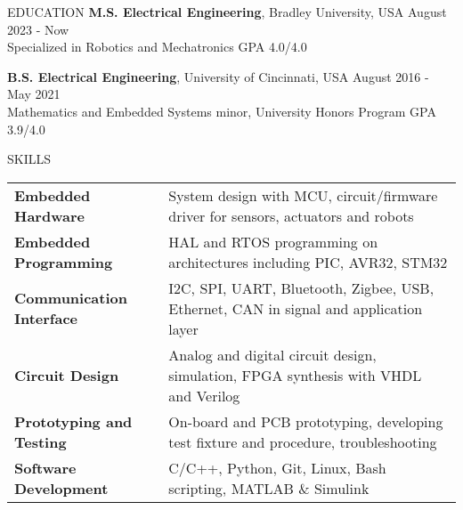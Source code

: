 \documentclass{lib/resume} %
\begin{document}

\begin{rSection}{EDUCATION}
    {\bf M.S. Electrical Engineering}, Bradley University, USA \hfill {August 2023 - Now} \\
    Specialized in Robotics and Mechatronics \hfill GPA 4.0/4.0 \smallskip

    {\bf B.S. Electrical Engineering}, University of Cincinnati, USA \hfill {August 2016 - May 2021}\\
    Mathematics and Embedded Systems minor, University Honors Program \hfill {GPA 3.9/4.0}



\end{rSection}

\begin{rSection}{SKILLS}

    \begin{tabular}{ @{} >{\bfseries}l @{\hspace{2ex}} l }
        Embedded Hardware       & System design with MCU, circuit/firmware driver for sensors, actuators and robots \\
        Embedded Programming    & HAL and RTOS programming on architectures including PIC, AVR32, STM32  \\
        Communication Interface & I2C, SPI, UART, Bluetooth, Zigbee, USB, Ethernet, CAN in signal and application layer \\
        Circuit Design          & Analog and digital circuit design, simulation, FPGA synthesis with VHDL and Verilog  \\
        Prototyping and Testing & On-board and PCB prototyping, developing test fixture and procedure, troubleshooting \\
        Software Development    & C/C++, Python, Git, Linux, Bash scripting, MATLAB \& Simulink \\
    \end{tabular}
\end{rSection}
\end{document}
